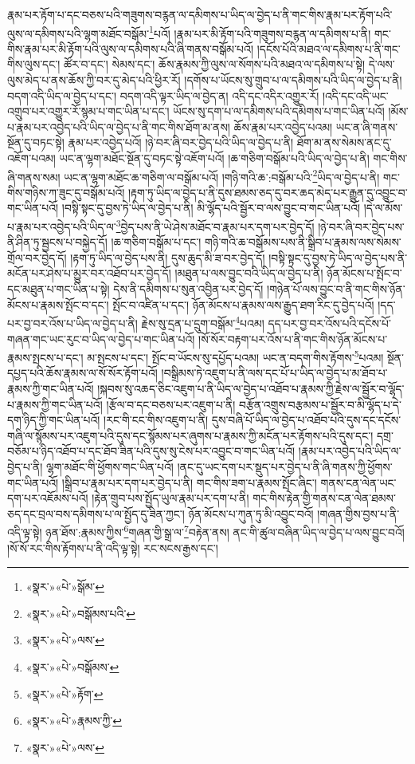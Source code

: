 རྣམ་པར་རྟོག་པ་དང་བཅས་པའི་གཟུགས་བརྙན་ལ་དམིགས་པ་ཡིད་ལ་བྱེད་པ་ནི་གང་གིས་རྣམ་པར་རྟོག་པའི་ལུས་ལ་དམིགས་པའི་ལྷག་མཐོང་བསྒོམ་\footnote{«སྣར་»«པེ་»སྒོམ་}པའོ། །རྣམ་པར་མི་རྟོག་པའི་གཟུགས་བརྙན་ལ་དམིགས་པ་ནི། གང་གིས་རྣམ་པར་མི་རྟོག་པའི་ལུས་ལ་དམིགས་པའི་ཞི་གནས་བསྒོམ་པའོ། །དངོས་པོའི་མཐའ་ལ་དམིགས་པ་ནི་གང་གིས་ལུས་དང་། ཚོར་བ་དང་། སེམས་དང་། ཆོས་རྣམས་ཀྱི་ལུས་ལ་སོགས་པའི་མཐའ་ལ་དམིགས་པ་སྟེ། དེ་ལས་ལུས་མེད་པ་ནས་ཆོས་ཀྱི་བར་དུ་མེད་པའི་ཕྱིར་རོ། །དགོས་པ་ཡོངས་སུ་གྲུབ་པ་ལ་དམིགས་པའི་ཡིད་ལ་བྱེད་པ་ནི། བདག་འདི་ཡིད་ལ་བྱེད་པ་དང་། བདག་འདི་ལྟར་ཡིད་ལ་བྱེད་ན། འདི་དང་འདིར་འགྱུར་རོ། །འདི་དང་འདི་ཡང་འགྲུབ་པར་འགྱུར་རོ་སྙམ་པ་གང་ཡིན་པ་དང་། ཡོངས་སུ་དག་པ་ལ་དམིགས་པའི་དམིགས་པ་གང་ཡིན་པའོ། །མོས་པ་རྣམ་པར་འབྱེད་པའི་ཡིད་ལ་བྱེད་པ་ནི་གང་གིས་ཐོག་མ་ནས། ཆོས་རྣམ་པར་འབྱེད་པའམ། ཡང་ན་ཞི་གནས་སྔོན་དུ་བཏང་སྟེ། རྣམ་པར་འབྱེད་པའོ། །ཉེ་བར་ཞི་བར་བྱེད་པའི་ཡིད་ལ་བྱེད་པ་ནི། ཐོག་མ་ནས་སེམས་ནང་དུ་འཇོག་པའམ། ཡང་ན་ལྷག་མཐོང་སྔོན་དུ་བཏང་སྟེ་འཇོག་པའོ། །ཆ་གཅིག་བསྒོམ་པའི་ཡིད་ལ་བྱེད་པ་ནི། གང་གིས་ཞི་གནས་སམ། ཡང་ན་ལྷག་མཐོང་ཆ་གཅིག་ལ་བསྒོམ་པའོ། །གཉི་གའི་ཆ་:བསྒོམ་པའི་\footnote{«སྣར་»«པེ་»བསྒོམས་པའི་}ཡིད་ལ་བྱེད་པ་ནི། གང་གིས་གཉིས་ཀ་ཟུང་དུ་བསྒོམ་པའོ། །རྟག་ཏུ་ཡིད་ལ་བྱེད་པ་ནི་དུས་ཐམས་ཅད་དུ་བར་ཆད་མེད་པར་རྒྱུན་དུ་འབྱུང་བ་གང་ཡིན་པའོ། །བསྟི་སྟང་དུ་བྱས་ཏེ་ཡིད་ལ་བྱེད་པ་ནི། མི་ལྷོད་པའི་སྦྱོར་བ་ལས་བྱུང་བ་གང་ཡིན་པའོ། །དེ་ལ་མོས་པ་རྣམ་པར་འབྱེད་པའི་ཡིད་ལ་\footnote{«སྣར་»«པེ་»ལས་}བྱེད་པས་ནི་ཡེ་ཤེས་མཐོང་བ་རྣམ་པར་དག་པར་བྱེད་དོ། །ཉེ་བར་ཞི་བར་བྱེད་པས་ནི་ཤིན་ཏུ་སྦྱངས་པ་བསྐྱེད་དོ། །ཆ་གཅིག་བསྒོམ་པ་དང་། གཉི་གའི་ཆ་བསྒོམས་པས་ནི་སྒྲིབ་པ་རྣམས་ལས་སེམས་གྲོལ་བར་བྱེད་དོ། །རྟག་ཏུ་ཡིད་ལ་བྱེད་པས་ནི། དུས་ཆུད་མི་ཟ་བར་བྱེད་དོ། །བསྟི་སྟང་དུ་བྱས་ཏེ་ཡིད་ལ་བྱེད་པས་ནི་མངོན་པར་ཤེས་པ་མྱུར་བར་འཐོབ་པར་བྱེད་དོ། །མཐུན་པ་ལས་བྱུང་བའི་ཡིད་ལ་བྱེད་པ་ནི། ཉོན་མོངས་པ་སྤོང་བ་དང་མཐུན་པ་གང་ཡིན་པ་སྟེ། དེས་ནི་དམིགས་པ་སུན་འབྱིན་པར་བྱེད་དོ། །གཉེན་པོ་ལས་བྱུང་བ་ནི་གང་གིས་ཉོན་མོངས་པ་རྣམས་སྤོང་བ་དང་། སྤོང་བ་འཛིན་པ་དང་། ཉོན་མོངས་པ་རྣམས་ལས་རྒྱུད་ཐག་རིང་དུ་བྱེད་པའོ། །དད་པར་བྱ་བར་འོས་པ་ཡིད་ལ་བྱེད་པ་ནི། རྗེས་སུ་དྲན་པ་དྲུག་བསྒོམ་\footnote{«སྣར་»«པེ་»བསྒོམས་}པའམ། དད་པར་བྱ་བར་འོས་པའི་དངོས་པོ་གཞན་གང་ཡང་རུང་བ་ཡིད་ལ་བྱེད་པ་གང་ཡིན་པའོ། །སོ་སོར་བརྟག་པར་འོས་པ་ནི་གང་གིས་ཉོན་མོངས་པ་རྣམས་སྤངས་པ་དང་། མ་སྤངས་པ་དང་། སྤོང་བ་ཡོངས་སུ་དཔྱོད་པའམ། ཡང་ན་བདག་གིས་རྟོགས་\footnote{«སྣར་»«པེ་»རྟོག་}པའམ། སྔོན་དཔྱད་པའི་ཆོས་རྣམས་ལ་སོ་སོར་རྟོག་པའོ། །བསྒྲིམས་ཏེ་འཇུག་པ་ནི་ལས་དང་པོ་པ་ཡིད་ལ་བྱེད་པ་མ་ཐོབ་པ་རྣམས་ཀྱི་གང་ཡིན་པའོ། །སྐབས་སུ་འཆད་ཅིང་འཇུག་པ་ནི་ཡིད་ལ་བྱེད་པ་འཐོབ་པ་རྣམས་ཀྱི་རྗེས་ལ་སྦྱོར་བ་ལྷོད་པ་རྣམས་ཀྱི་གང་ཡིན་པའོ། །རྩོལ་བ་དང་བཅས་པར་འཇུག་པ་ནི། བརྩོན་འགྲུས་བརྩམས་པ་སྦྱོར་བ་མི་ལྷོད་པ་དེ་དག་ཉིད་ཀྱི་གང་ཡིན་པའོ། །རང་གི་ངང་གིས་འཇུག་པ་ནི། དུས་བཞི་པོ་ཡིད་ལ་བྱེད་པ་འཐོབ་པའི་དུས་དང་དངོས་གཞི་ལ་སྙོམས་པར་འཇུག་པའི་དུས་དང་སྙོམས་པར་ཞུགས་པ་རྣམས་ཀྱི་མངོན་པར་རྟོགས་པའི་དུས་དང་། དགྲ་བཅོམ་པ་ཉིད་འཐོབ་པ་དང་ཐོབ་ཟིན་པའི་དུས་སུ་ངེས་པར་འབྱུང་བ་གང་ཡིན་པའོ། །རྣམ་པར་འབྱེད་པའི་ཡིད་ལ་བྱེད་པ་ནི། ལྷག་མཐོང་གི་ཕྱོགས་གང་ཡིན་པའོ། །ནང་དུ་ཡང་དག་པར་སྡུད་པར་བྱེད་པ་ནི་ཞི་གནས་ཀྱི་ཕྱོགས་གང་ཡིན་པའོ། །སྒྲིབ་པ་རྣམ་པར་དག་པར་བྱེད་པ་ནི། གང་གིས་ཟག་པ་རྣམས་སྤོང་ཞིང་། གནས་ངན་ལེན་ཡང་དག་པར་འཇོམས་པའོ། །རྟེན་གྲུབ་པས་སྤྱོད་ཡུལ་རྣམ་པར་དག་པ་ནི། གང་གིས་རྟེན་གྱི་གནས་ངན་ལེན་ཐམས་ཅད་དང་བྲལ་བས་དམིགས་པ་ལ་སྤྱོད་དུ་ཟིན་ཀྱང་། ཉོན་མོངས་པ་ཀུན་ཏུ་མི་འབྱུང་བའོ། །གཞན་གྱིས་བྱས་པ་ནི་འདི་ལྟ་སྟེ། ཉན་ཐོས་:རྣམས་ཀྱིས་\footnote{«སྣར་»«པེ་»རྣམས་ཀྱི་}གཞན་གྱི་སྒྲ་ལ་\footnote{«སྣར་»«པེ་»ལས་}བརྟེན་ནས། ནང་གི་ཚུལ་བཞིན་ཡིད་ལ་བྱེད་པ་ལས་བྱུང་བའོ། །སོ་སོ་རང་གིས་རྟོགས་པ་ནི་འདི་ལྟ་སྟེ། རང་སངས་རྒྱས་དང་། 